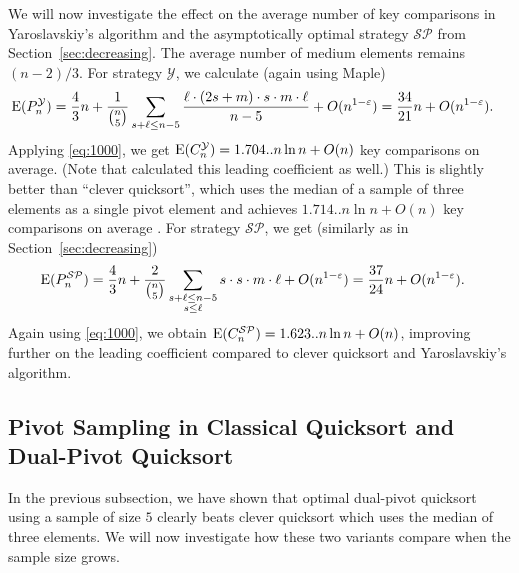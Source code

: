 \documentclass[prodmode,acmtalg]{acmsmall}
\newcommand{\E}{\textnormal{\textrm{E}}}
\begin{document}
We will now investigate the effect on the average number of key comparisons in
Yaroslavskiy's algorithm and the asymptotically optimal strategy $\mathcal{SP}$ 
from Section~\ref{sec:decreasing}. The average
number of medium elements remains $(n-2)/3$.  For strategy $\mathcal{Y}$, we
calculate (again using Maple\textsuperscript{\textregistered})
\begin{align*}
    \E(P^\mathcal{Y}_n) &= \frac{4}{3}n  + \frac{1}{\binom{n}{5}}
    \sum_{s + \ell \leq n - 5} \frac{\ell \cdot (2s + m) \cdot s \cdot m \cdot
    \ell}{n-5} + O(n^{1 - \varepsilon}) = \frac{34}{21}n + O(n^{1 - \varepsilon}).
\end{align*}
Applying \eqref{eq:1000}, we get $\E(C^\mathcal{Y}_n) = 1.704.. n \ln n + O(n)$ 
key comparisons on average. (Note that \cite{nebel13} calculated
this leading coefficient as well.) This is slightly better than ``clever
quicksort'', which uses the median of a sample of three elements as a single
pivot element and achieves $1.714.. n \ln n + O(n)$  key comparisons on average
\cite{vanEmden}.  For strategy $\mathcal{SP}$, we get (similarly as in Section~\ref{sec:decreasing})
\begin{align*}
    \E(P^\mathcal{SP}_n) &=  \frac{4}{3}n +  \frac{2}{\binom{n}{5}}
    \sum_{\substack{s + \ell \leq n-5\\s \leq \ell}} s \cdot s \cdot m \cdot
    \ell + O(n^{1 - \varepsilon}) = \frac{37}{24}n + O(n^{1 - \varepsilon}).
\end{align*}
Again using \eqref{eq:1000}, we obtain $\E(C^\mathcal{SP}_n) = 1.623.. n \ln
n + O(n)$, improving further
on the leading coefficient compared to clever quicksort and Yaroslavskiy's
algorithm.

\subsection{Pivot Sampling in Classical Quicksort and Dual-Pivot Quicksort}
In the previous subsection, we have shown that optimal dual-pivot quicksort
using a sample of size $5$ clearly beats clever quicksort which uses the median
of three elements. We will now investigate how these two variants compare when
the sample size grows.
\end{document}
